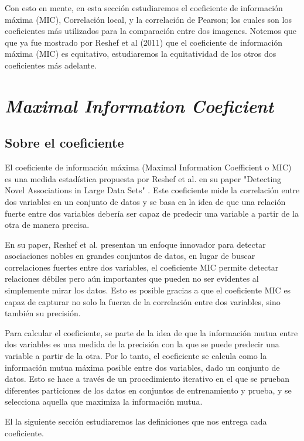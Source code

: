 Con esto en mente, en esta secci\'on estudiaremos el coeficiente de informaci\'on m\'axima (MIC), Correlaci\'on local, y la correlaci\'on de Pearson; los cuales son los coeficientes m\'as utilizados para la comparaci\'on entre dos imagenes. Notemos que que ya fue mostrado por Reshef et al (2011) que el coeficiente de informaci\'on m\'axima (MIC) es equitativo, estudiaremos la equitatividad de los otros dos coeficientes m\'as adelante.

\section[]{\textit{Maximal Information Coeficient}}

\subsection{Sobre el coeficiente}

	El coeficiente de informaci\'on m\'axima (Maximal Information Coefficient o MIC) es una medida estad\'istica propuesta por Reshef et al. en su paper "Detecting Novel Associations in Large Data Sets" \cite{Reshef2011}. Este coeficiente mide la correlaci\'on entre dos variables en un conjunto de datos y se basa en la idea de que una relaci\'on fuerte entre dos variables deber\'ia ser capaz de predecir una variable a partir de la otra de manera precisa.

	En su paper, Reshef et al. presentan un enfoque innovador para detectar asociaciones nobles en grandes conjuntos de datos, en lugar de buscar correlaciones fuertes entre dos variables, el coeficiente MIC permite detectar relaciones d\'ebiles pero a\'un importantes que pueden no ser evidentes al simplemente mirar los datos. Esto es posible gracias a que el coeficiente MIC es capaz de capturar no solo la fuerza de la correlaci\'on entre dos variables, sino tambi\'en su precisi\'on.

	Para calcular el coeficiente, se parte de la idea de que la informaci\'on mutua entre dos variables es una medida de la precisi\'on con la que se puede predecir una variable a partir de la otra. Por lo tanto, el coeficiente se calcula como la informaci\'on mutua m\'axima posible entre dos variables, dado un conjunto de datos. Esto se hace a trav\'es de un procedimiento iterativo en el que se prueban diferentes particiones de los datos en conjuntos de entrenamiento y prueba, y se selecciona aquella que maximiza la informaci\'on mutua.

	El la siguiente secci\'on estudiaremos las definiciones que nos entrega cada coeficiente.
 
